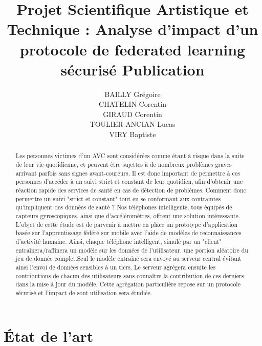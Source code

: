 \documentclass{article}
\begin{document}
\title{Projet Scientifique Artistique et Technique : 
\newline Analyse d'impact d'un protocole de federated learning sécurisé Publication}
\author{BAILLY Grégoire \\ CHATELIN Corentin \\ GIRAUD Corentin \\ TOULIER-ANCIAN Lucas \\ VIRY Baptiste }

\maketitle

\newpage
\tableofcontents
\newpage

\begin{abstract}
Les personnes victimes d'un AVC sont considérées comme étant à risque dans la suite de leur vie quotidienne, et peuvent être sujettes à de nombreux problèmes graves arrivant parfois sans signes avant-coureurs. Il est donc important de permettre à ces personnes d'accéder à un suivi strict et constant de leur quotidien, afin d'obtenir une réaction rapide des services de santé en cas de détection de problèmes. Comment donc permettre un suivi "strict et constant" tout en se conformant aux contraintes qu'impliquent des données de santé ? Nos téléphones intelligents, tous équipés de capteurs gyroscopiques, ainsi que d'accéléromètres, offrent une solution intéressante. L'objet de cette étude est de parvenir à mettre en place un prototype d'application basée sur l'apprentissage fédéré sur mobile avec l'aide de modèles de reconnaissances d'activité humaine. Ainsi, chaque téléphone intelligent, simulé par un "client"  entraînera/raffinera un modèle sur les données de l'utilisateur, une portion aléatoire du jeu de donnée complet.Seul le modèle entraîné sera envoyé au serveur central évitant ainsi l'envoi de données sensibles à un tiers. Le serveur agrégera ensuite les contributions de chacun des utilisateurs sans connaître la contribution de ces derniers dans la mise à jour du modèle. Cette agrégation particulière repose sur un protocole sécurisé et l'impact de sont utilisation sera étudiée.
\end{abstract}

\section{État de l'art}
\end{document}

